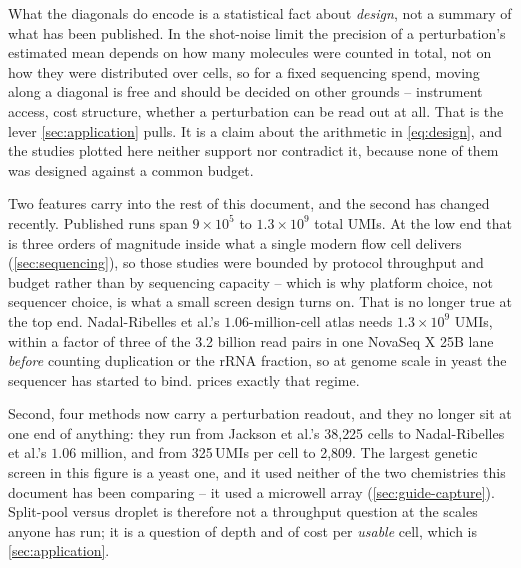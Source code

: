 What the diagonals do encode is a statistical fact about \emph{design}, not a
summary of what has been published. In the shot-noise limit the precision of a
perturbation's estimated mean depends on how many molecules were counted in
total, not on how they were distributed over cells, so for a fixed sequencing
spend, moving along a diagonal is free and should be decided on other grounds -- instrument access, cost structure, whether a perturbation can be read out at all.
That is the lever \cref{sec:application} pulls. It is a claim about the arithmetic
in \cref{eq:design}, and the studies plotted here neither support nor contradict
it, because none of them was designed against a common budget.

Two features carry into the rest of this document, and the second has changed
recently. Published runs span $9\times10^{5}$ to $1.3\times10^{9}$ total UMIs.
At the low end that is three orders of magnitude inside what a single modern flow
cell delivers (\cref{sec:sequencing}), so those studies were bounded by protocol
throughput and budget rather than by sequencing capacity -- which is why platform
choice, not sequencer choice, is what a small screen design turns on. That is no
longer true at the top end. Nadal-Ribelles et al.'s
$1.06$-million-cell atlas needs $1.3\times10^{9}$ UMIs, within a factor of three
of the 3.2 billion read pairs in one NovaSeq X 25B lane \emph{before} counting
duplication or the rRNA fraction, so at genome scale in yeast the sequencer has
started to bind.  prices exactly that regime.

Second, four methods now carry a perturbation readout, and they no longer sit at
one end of anything: they run from Jackson et al.'s 38{,}225 cells to
Nadal-Ribelles et al.'s $1.06$ million, and from 325\,UMIs per cell to 2{,}809.
The largest genetic screen in this figure is a yeast one, and it used neither of
the two chemistries this document has been comparing -- it used a microwell
array (\cref{sec:guide-capture}). Split-pool versus droplet is therefore
not a throughput question at the scales anyone has run; it is a question of depth
and of cost per \emph{usable} cell, which is \cref{sec:application}.

